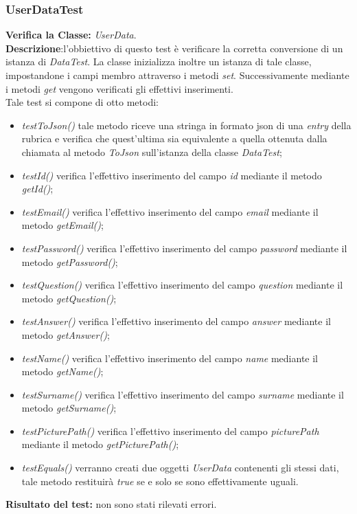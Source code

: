 \subsubsection{UserDataTest}
\textbf{Verifica la Classe:} \textit{UserData}.\\
\textbf{Descrizione}:l'obbiettivo di questo test è verificare la corretta conversione di un istanza di \textit{DataTest}. La classe inizializza inoltre un istanza di tale classe, impostandone i campi membro attraverso i metodi \textit{set}. Successivamente mediante i metodi \textit{get} vengono verificati gli effettivi inserimenti.\\
Tale test si compone di otto metodi:
\begin{itemize}
\item \textit{testToJson() } tale metodo riceve una stringa in formato json di una 	\textit{entry} della rubrica e verifica che quest'ultima sia equivalente a quella ottenuta dalla chiamata al metodo \textit{ToJson} sull'istanza della classe \textit{DataTest};
\item \textit{testId() } verifica l'effettivo inserimento del campo \textit{id} mediante il metodo \textit{getId()};
\item \textit{testEmail() } verifica l'effettivo inserimento del campo \textit{email} mediante il metodo \textit{getEmail()};
\item \textit{testPassword() } verifica l'effettivo inserimento del campo \textit{password} mediante il metodo \textit{getPassword()};
\item \textit{testQuestion() } verifica l'effettivo inserimento del campo \textit{question} mediante il metodo \textit{getQuestion()};
\item \textit{testAnswer() } verifica l'effettivo inserimento del campo \textit{answer} mediante il metodo \textit{getAnswer()};
\item \textit{testName() } verifica l'effettivo inserimento del campo \textit{name} mediante il metodo \textit{getName()};
\item \textit{testSurname() } verifica l'effettivo inserimento del campo \textit{surname} mediante il metodo \textit{getSurname()};
\item \textit{testPicturePath() } verifica l'effettivo inserimento del campo \textit{picturePath} mediante il metodo \textit{getPicturePath()};
\item{\textit{testEquals()}} verranno creati due oggetti \textit{UserData} contenenti gli stessi dati, tale metodo restituirà \textit{true} se e solo se sono effettivamente uguali.
\end{itemize}
\textbf{Risultato del test:} non sono stati rilevati errori.

